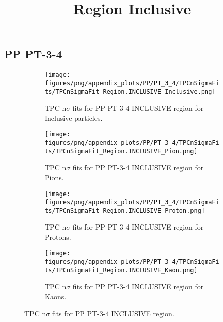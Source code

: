             \subsection{PP PT-3-4}
            \begin{figure}[H]
                \title{Region Inclusive}
                \begin{subfigure}[b]{0.5\textwidth}
                    \centering
                    \texttt{[image: figures/png/appendix\_plots/PP/PT\_3\_4/TPCnSigmaFits/TPCnSigmaFit\_Region.INCLUSIVE\_Inclusive.png]}
                    \caption{TPC n$\sigma$ fits for PP PT-3-4 INCLUSIVE region for Inclusive particles.}
                    \label{fig:appendix_PP_PT-3-4_INCLUSIVE_Inclusive}
                \end{subfigure}
                \begin{subfigure}[b]{0.5\textwidth}
                    \centering
                    \texttt{[image: figures/png/appendix\_plots/PP/PT\_3\_4/TPCnSigmaFits/TPCnSigmaFit\_Region.INCLUSIVE\_Pion.png]}
                    \caption{TPC n$\sigma$ fits for PP PT-3-4 INCLUSIVE region for Pions.}
                    \label{fig:appendix_PP_PT-3-4_INCLUSIVE_Pion}
                \end{subfigure}
                \begin{subfigure}[b]{0.5\textwidth}
                    \centering
                    \texttt{[image: figures/png/appendix\_plots/PP/PT\_3\_4/TPCnSigmaFits/TPCnSigmaFit\_Region.INCLUSIVE\_Proton.png]}
                    \caption{TPC n$\sigma$ fits for PP PT-3-4 INCLUSIVE region for Protons.}
                    \label{fig:appendix_PP_PT-3-4_INCLUSIVE_Proton}
                \end{subfigure}
                \begin{subfigure}[b]{0.5\textwidth}
                    \centering
                    \texttt{[image: figures/png/appendix\_plots/PP/PT\_3\_4/TPCnSigmaFits/TPCnSigmaFit\_Region.INCLUSIVE\_Kaon.png]}
                    \caption{TPC n$\sigma$ fits for PP PT-3-4 INCLUSIVE region for Kaons.}
                    \label{fig:appendix_PP_PT-3-4_INCLUSIVE_Kaon}
                \end{subfigure}
                \caption{TPC n$\sigma$ fits for PP PT-3-4 INCLUSIVE region.}
                \label{fig:appendix_PP_PT-3-4_INCLUSIVE}
            \end{figure}
